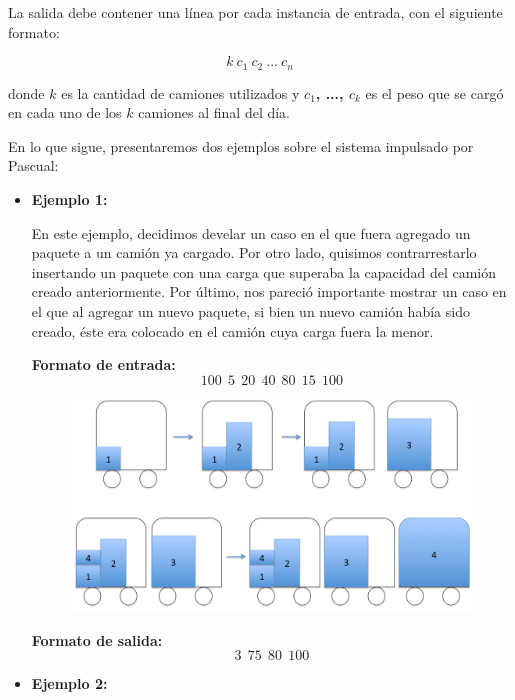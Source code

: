 La salida debe contener una línea por cada instancia de entrada, con el siguiente formato:

$$k\ c_{1}\ c_{2}\ ...\ c_{n}$$


donde \textbf{$k$} es la cantidad de camiones utilizados y \textbf{$c_{1}$, ..., $c_{k}$} es el peso que se cargó en cada uno de los \textbf{$k$} camiones al final del día.\newline

En lo que sigue, presentaremos dos ejemplos sobre el sistema impulsado por Pascual:
\begin{itemize}
\item {\large{\textbf{Ejemplo 1:}}}\newline

En este ejemplo, decidimos develar un caso en el que fuera agregado un paquete a un camión ya cargado. Por otro lado, quisimos contrarrestarlo insertando un paquete con una carga que superaba la capacidad del camión creado anteriormente. Por último, nos pareció importante mostrar un caso en el que al agregar un nuevo paquete, si bien un nuevo camión había sido creado, éste era colocado en el camión cuya carga fuera la menor.\newline

\textbf{Formato de entrada:}
$$100\ \ 5\ \ 20\ \ 40\ \ 80\ \ 15\ \ 100$$

\begin{figure}[H] %
\begin{center}
\includegraphics[width=320pt]{../imgs/ejemplo1.jpg}
\end{center}
\end{figure}

\textbf{Formato de salida:}
$$3\ \ 75\ \ 80\ \ 100$$


\item {\large{\textbf{Ejemplo 2:}}}\newline


\end{itemize}
